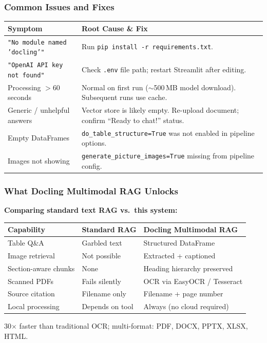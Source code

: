 \begin{frame}[fragile]\frametitle{Common Issues and Fixes}

\begin{center}
\small
\begin{tabular}{p{3.8cm}p{6cm}}
\hline
\textbf{Symptom} & \textbf{Root Cause \& Fix} \\
\hline
\texttt{"No module named 'docling'"} & Run \texttt{pip install -r requirements.txt}. \\
\texttt{"OpenAI API key not found"} & Check \texttt{.env} file path; restart Streamlit after editing. \\
Processing $>$60 seconds & Normal on first run ($\sim$500\,MB model download). Subsequent runs use cache. \\
Generic / unhelpful answers & Vector store is likely empty. Re-upload document; confirm ``Ready to chat!'' status. \\
Empty DataFrames & \texttt{do\_table\_structure=True} was not enabled in pipeline options. \\
Images not showing & \texttt{generate\_picture\_images=True} missing from pipeline config. \\
\hline
\end{tabular}
\end{center}

\end{frame}

\begin{frame}[fragile]\frametitle{What Docling Multimodal RAG Unlocks}

\textbf{Comparing standard text RAG vs.\ this system:}

\begin{center}
\small
\begin{tabular}{lll}
\hline
\textbf{Capability} & \textbf{Standard RAG} & \textbf{Docling Multimodal RAG} \\
\hline
Table Q\&A & Garbled text & Structured DataFrame \\
Image retrieval & Not possible & Extracted + captioned \\
Section-aware chunks & None & Heading hierarchy preserved \\
Scanned PDFs & Fails silently & OCR via EasyOCR / Tesseract \\
Source citation & Filename only & Filename + page number \\
Local processing & Depends on tool & Always (no cloud required) \\
\hline
\end{tabular}
\end{center}

\vspace{0.3em}
{\small 30$\times$ faster than traditional OCR; multi-format: PDF, DOCX, PPTX, XLSX, HTML.}

\end{frame}

